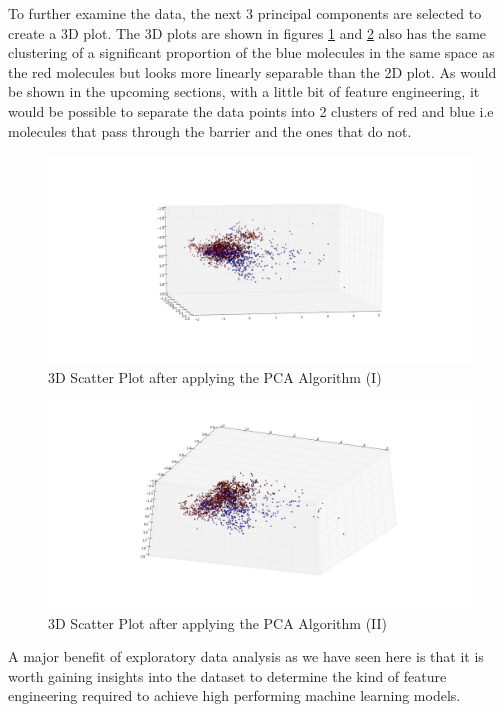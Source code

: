 \documentclass[a4paper,12pt]{report}
\begin{document}
		To further examine the data, the next 3 principal components are selected to create a 3D plot. The 3D plots are shown in figures \ref{fig:scatter_pca_3D} and \ref{fig:scatter_pca_3D_2} also has the same clustering of a significant proportion of the blue molecules in the same space as the red molecules but looks more linearly separable than the 2D plot. As would be shown in the upcoming sections, with a little bit of feature engineering, it would be possible to separate the data points into 2 clusters of red and blue i.e molecules that pass through the barrier and the ones that do not. 
		\begin{figure}[H]
			\centering
			\includegraphics[width=\textwidth,scale=1,totalheight=0.4\textheight]{images/scatter_pca_3D}
			\caption{3D Scatter Plot after applying the PCA Algorithm (I)}
			\label{fig:scatter_pca_3D}
		\end{figure}
		\begin{figure}[H]
			\centering
			\includegraphics[width=\textwidth,scale=1,totalheight=0.4\textheight]{images/scatter_pca_3D_2}
			\caption{3D Scatter Plot after applying the PCA Algorithm (II)}
			\label{fig:scatter_pca_3D_2}
		\end{figure}
		
		A major benefit of exploratory data analysis as we have seen here is that it is worth gaining insights into the dataset to determine the kind of feature engineering required to achieve high performing machine learning models.
	
\end{document}
